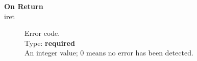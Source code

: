 \begin{description}
\item[\bf On Return]
\item[iret] Error code.\\
Type: {\bf required} \\
An integer value; 0 means no error has been detected. 
\end{description}



